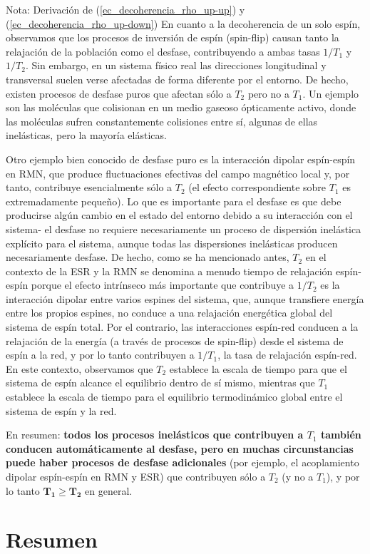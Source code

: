\documentclass[a4paper,11pt]{book} %
\numberwithin{equation}{chapter}
\begin{document}
\begin{mybox_blue}{Nota: Derivación de (\ref{ec_decoherencia_rho_up-up}) y  (\ref{ec_decoherencia_rho_up-down})}
En cuanto a la decoherencia de un solo espín, observamos que los procesos de inversión de espín (spin-flip) causan tanto la relajación de la población como el desfase, contribuyendo a ambas tasas $1/T_1$ y $1/T_2$. Sin embargo, en un sistema físico real las direcciones longitudinal y transversal suelen verse afectadas de forma diferente por el entorno. De hecho, existen procesos de desfase puros que afectan sólo a $T_2$ pero no a $T_1$. Un ejemplo son las moléculas que colisionan en un medio gaseoso ópticamente activo, donde las moléculas sufren constantemente colisiones entre sí, algunas de ellas inelásticas, pero la mayoría elásticas.

Otro ejemplo bien conocido de desfase puro es la interacción dipolar espín-espín en RMN, que produce fluctuaciones efectivas del campo magnético local y, por tanto, contribuye esencialmente sólo a $T_2$ (el efecto correspondiente sobre $T_1$ es extremadamente pequeño). Lo que es importante para el desfase es que debe producirse algún cambio en el estado del entorno debido a su interacción con el sistema- el desfase no requiere necesariamente un proceso de dispersión inelástica explícito para el sistema, aunque todas las dispersiones inelásticas producen necesariamente desfase. De hecho, como se ha mencionado antes, $T_2$ en el contexto de la ESR y la RMN se denomina a menudo tiempo de relajación espín-espín porque el efecto intrínseco más importante que contribuye a $1/T_2$ es la interacción dipolar entre varios espines del sistema, que, aunque transfiere energía entre los propios espines, no conduce a una relajación energética global del sistema de espín total. Por el contrario, las interacciones espín-red conducen a la relajación de la energía (a través de procesos de spin-flip) desde el sistema de espín a la red, y por lo tanto contribuyen a $1/T_1$, la tasa de relajación espín-red. En este contexto, observamos que $T_2$ establece la escala de tiempo para que el sistema de espín alcance el equilibrio dentro de sí mismo, mientras que $T_1$ establece la escala de tiempo para el equilibrio termodinámico global entre el sistema de espín y la red. 

En resumen: \textbf{todos los procesos inelásticos que contribuyen a $T_1$ también conducen automáticamente al desfase, pero en muchas circunstancias puede haber procesos de desfase adicionales} (por ejemplo, el acoplamiento dipolar espín-espín en RMN y ESR) que contribuyen sólo a $T_2$ (y no a $T_1$), y por lo tanto $\bm{T_1 \geq T_2}$ en general.


	\section{Resumen}


\end{mybox_blue}
\end{document}
